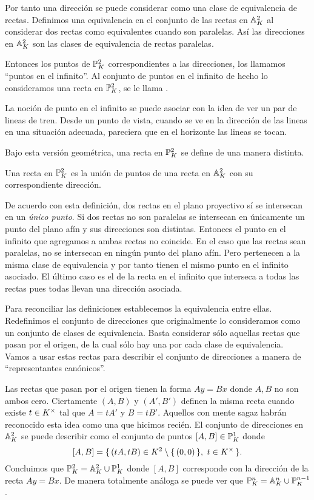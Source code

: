 \documentclass[12pt]{memoir}
\begin{document}
Por tanto una dirección se puede considerar como una clase de equivalencia de rectas. Definimos una equivalencia en el conjunto de las rectas en $\mathbb{A}_K^2$ al considerar dos rectas como equivalentes cuando son paralelas. Así las direcciones en $\mathbb{A}^2_K$ son las clases de equivalencia de rectas paralelas.\par 
Entonces los puntos de $\mathbb{P}_K^2$ correspondientes a las direcciones, los llamamos ``puntos en el infinito''. Al conjunto de puntos en el infinito de hecho lo consideramos una recta en $\mathbb{P}_K^2$, se le llama . 
\begin{Ex}
  La noción de punto en el infinito se puede asociar con la idea de ver un par de lineas de tren. Desde un punto de vista, cuando se ve en la dirección de las lineas en una situación adecuada, pareciera que en el horizonte las lineas se tocan.\par 
\end{Ex}

Bajo esta versión geométrica, una recta en $\mathbb{P}_K^2$ se define de una manera distinta.

\begin{Def} 
  Una recta en $\mathbb{P}_K^2$ es la unión de puntos de una recta en $\mathbb{A}_K^2$ con su correspondiente dirección.
\end{Def}

De acuerdo con esta definición, dos rectas en el plano proyectivo sí se intersecan en un \emph{único punto}. Si dos rectas no son paralelas se intersecan en únicamente un punto del plano afín y sus direcciones son distintas.  Entonces el punto en el infinito que agregamos a ambas rectas no coincide. En el caso que las rectas sean paralelas, no se intersecan en ningún punto del plano afín. Pero pertenecen a la misma clase de equivalencia y por tanto tienen el mismo punto en el infinito asociado. El último caso es el de la recta en el infinito que interseca a todas las rectas pues todas llevan una dirección asociada.\par 
Para reconciliar las definiciones establecemos la equivalencia entre ellas. Redefinimos el conjunto de direcciones que originalmente lo consideramos como un conjunto de clases de equivalencia. Basta considerar sólo aquellas rectas que pasan por el origen, de la cual sólo hay una por cada clase de equivalencia. Vamos a usar estas rectas para describir el conjunto de direcciones a manera de ``representantes canónicos''.\par 
Las rectas que pasan por el origen tienen la forma $Ay=Bx$ donde $A,B$ no son ambos cero. Ciertamente $(A,B)$ y $(A',B')$ definen la misma recta cuando existe $t\in K^\times$ tal que $A=tA'$ y $B=tB'$. Aquellos con mente sagaz habrán reconocido esta idea como una que hicimos recién. El conjunto de direcciones en $\mathbb{A}_K^2$ se puede describir como el conjunto de puntos $[A,B]\in\mathbb{P}_K^1$ donde 
$$[A,B]=\{\,(tA,tB)\in K^2\setminus\{\,(0,0)\,\},\ t\in K^\times\,\}.$$
Concluimos que $\mathbb{P}_K^2=\mathbb{A}_K^2\cup\mathbb{P}_K^1$ donde $[A,B]$ corresponde con la dirección de la recta $Ay=Bx$. De manera totalmente análoga se puede ver que $\mathbb{P}_K^n=\mathbb{A}_K^n\cup\mathbb{P}_K^{n-1}$.
\end{document}

